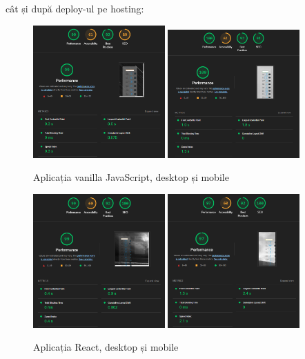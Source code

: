 \documentclass[12pt, a4paper]{report}
\begin{document}
\newpage
cât și după deploy-ul pe hosting:

\begin{figure}[htbp]
	\centering
	\includegraphics[width=0.45\textwidth]{01_desktop_deployed_lighthouse.png}
	\includegraphics[width=0.45\textwidth]{01_mobile_deployed_lighthouse.png}
	\caption{Aplicația vanilla JavaScript, desktop și mobile}
	\label{fig:01-deployed-lighthouse}
\end{figure}

\begin{figure}[htbp]
	\centering
	\includegraphics[width=0.45\textwidth]{02_desktop_deployed_lighthouse.png}
	\includegraphics[width=0.45\textwidth]{02_mobile_deployed_lighthouse.png}
	\caption{Aplicația React, desktop și mobile}
	\label{fig:02-deployed-lighthouse}
\end{figure}
\end{document}
